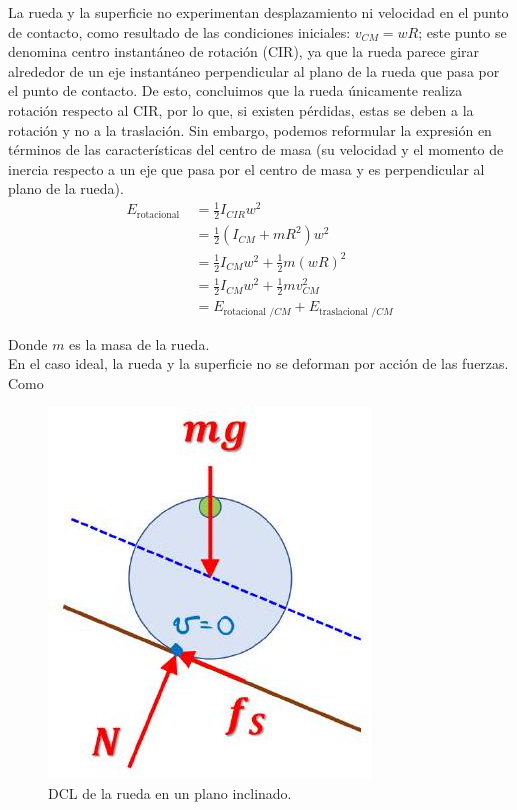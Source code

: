 \documentclass[10pt]{article}
\begin{document}
La rueda y la superficie no experimentan desplazamiento ni velocidad en el punto de contacto, como resultado de las condiciones iniciales: $v_{C M} = w R$; este punto se denomina centro instantáneo de rotación (CIR), ya que la rueda parece girar alrededor de un eje instantáneo perpendicular al plano de la rueda que pasa por el punto de contacto. De esto, concluimos que la rueda únicamente realiza rotación respecto al CIR, por lo que, si existen pérdidas, estas se deben a la rotación y no a la traslación. Sin embargo, podemos reformular la expresión en términos de las características del centro de masa (su velocidad y el momento de inercia respecto a un eje que pasa por el centro de masa y es perpendicular al plano de la rueda).
$$
\begin{aligned}
E_{\text {rotacional }} & =\frac{1}{2} I_{C I R} w^{2} \\
& =\frac{1}{2}\left(I_{C M}+m R^{2}\right) w^{2} \\
& =\frac{1}{2} I_{C M} w^{2}+\frac{1}{2} m(w R)^{2} \\
& =\frac{1}{2} I_{C M} w^{2}+\frac{1}{2} m v_{C M}^{2} \\
& =E_{\text {rotacional } / C M}+E_{\text {traslacional } / C M}
\end{aligned}
$$

Donde $m$ es la masa de la rueda.\\
En el caso ideal, la rueda y la superficie no se deforman por acción de las fuerzas. Como\\

\begin{figure}[H]
    \centering
\includegraphics[scale = 0.30, center]{2025_04_01_ea720b93e8ebb5d0c6aeg-08}
\caption{DCL de la rueda en un plano inclinado.}
\end{figure}
\end{document}
